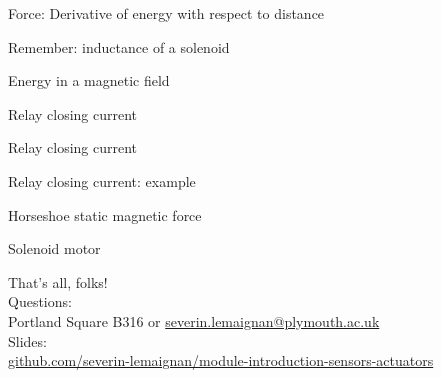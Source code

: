 \documentclass[compress]{beamer}
\begin{document}
{
    \begin{frame}{Force: Derivative of energy with respect to distance}
    \end{frame}
}

{
    \begin{frame}{Remember: inductance of a solenoid}
    \end{frame}
}

{
    \begin{frame}{Energy in a magnetic field}
    \end{frame}
}

{
    \begin{frame}{Relay closing current}
    \end{frame}
}

{
    \begin{frame}{Relay closing current}
    \end{frame}
}

{
    \begin{frame}{Relay closing current: example}
    \end{frame}
}

{
    \begin{frame}{Horseshoe static magnetic force}
    \end{frame}
}

{
    \begin{frame}{Solenoid motor}
    \end{frame}
}


\begin{frame}{}
    \begin{center}
        \Large
        That's all, folks!\\[2em]
        \normalsize
        Questions:\\
        Portland Square B316 or \url{severin.lemaignan@plymouth.ac.uk} \\[1em]

        Slides:\\
        \href{https://github.com/severin-lemaignan/module-mobile-and-humanoid-robots}{\small
        github.com/severin-lemaignan/module-introduction-sensors-actuators}


    \end{center}
\end{frame}
\end{document}
